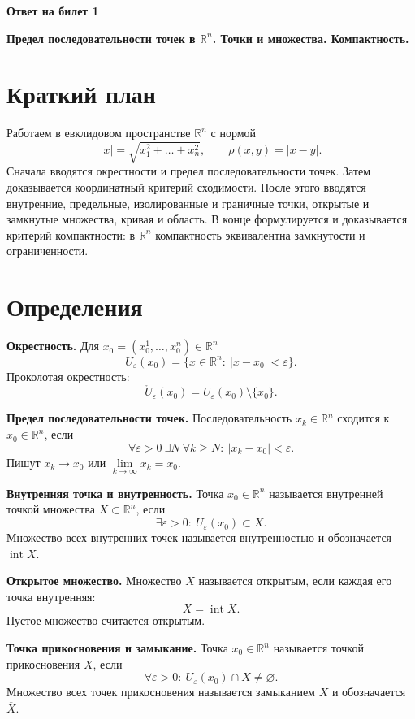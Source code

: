 \documentclass[12pt,a4paper]{article}
\newcommand{\R}{\mathbb{R}}
\newcommand{\eps}{\varepsilon}
\newcommand{\Ball}[2]{U_{#1}(#2)}
\newcommand{\PBall}[2]{\mathring U_{#1}(#2)}
\begin{document}
\begin{center}
{\Large\bfseries Ответ на билет 1}

{\bfseries Предел последовательности точек в \(\R^n\). Точки и множества.
Компактность.}
\end{center}

\section*{Краткий план}

Работаем в евклидовом пространстве \(\R^n\) с нормой
\[
  |x|=\sqrt{x_1^2+\dots+x_n^2}, \qquad \rho(x,y)=|x-y|.
\]
Сначала вводятся окрестности и предел последовательности точек. Затем
доказывается координатный критерий сходимости. После этого вводятся
внутренние, предельные, изолированные и граничные точки, открытые и
замкнутые множества, кривая и область. В конце формулируется и доказывается
критерий компактности: в \(\R^n\) компактность эквивалентна замкнутости и
ограниченности.

\section*{Определения}

\textbf{Окрестность.}
Для \(x_0=(x_0^1,\dots,x_0^n)\in\R^n\)
\[
  \Ball{\eps}{x_0}=\{x\in\R^n:\ |x-x_0|<\eps\}.
\]
Проколотая окрестность:
\[
  \PBall{\eps}{x_0}=\Ball{\eps}{x_0}\setminus\{x_0\}.
\]

\textbf{Предел последовательности точек.}
Последовательность \(x_k\in\R^n\) сходится к \(x_0\in\R^n\), если
\[
  \forall \eps>0\ \exists N\ \forall k\ge N:\ |x_k-x_0|<\eps.
\]
Пишут \(x_k\to x_0\) или \(\lim\limits_{k\to\infty}x_k=x_0\).

\textbf{Внутренняя точка и внутренность.}
Точка \(x_0\in\R^n\) называется внутренней точкой множества \(X\subset\R^n\),
если
\[
  \exists \eps>0:\ \Ball{\eps}{x_0}\subset X.
\]
Множество всех внутренних точек называется внутренностью и обозначается
\(\operatorname{int}X\).

\textbf{Открытое множество.}
Множество \(X\) называется открытым, если каждая его точка внутренняя:
\[
  X=\operatorname{int}X.
\]
Пустое множество считается открытым.

\textbf{Точка прикосновения и замыкание.}
Точка \(x_0\in\R^n\) называется точкой прикосновения \(X\), если
\[
  \forall \eps>0:\ \Ball{\eps}{x_0}\cap X\ne\varnothing.
\]
Множество всех точек прикосновения называется замыканием \(X\) и обозначается
\(\overline X\).
\end{document}
